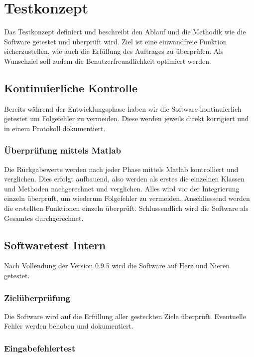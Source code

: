 \section{Testkonzept} \label{sec:Testkonzept}

Das Testkonzept definiert und beschreibt den Ablauf und die Methodik wie die Software getestet und überprüft wird. Ziel ist eine einwandfreie Funktion sicherzustellen, wie auch die Erfüllung des Auftrages zu überprüfen. Als Wunschziel soll zudem die Benutzerfreundlichkeit optimiert werden.


\subsection{Kontinuierliche Kontrolle } \label{subsec:1}

Bereits während der Entwicklungsphase haben wir die Software kontinuierlich getestet um Folgefehler zu vermeiden. Diese werden jeweils direkt korrigiert und in einem Protokoll dokumentiert. 

\subsubsection{Überprüfung mittels Matlab  } \label{subsubsec:1}

Die Rückgabewerte werden nach jeder Phase mittels Matlab kontrolliert und verglichen.
Dies erfolgt aufbauend, also werden als erstes die einzelnen Klassen und Methoden nachgerechnet und verglichen. Alles wird vor der Integrierung einzeln überprüft, um wiederum Folgefehler zu vermeiden. Anschliessend werden die erstellten Funktionen einzeln überprüft. Schlussendlich wird die Software als Gesamtes durchgerechnet.


\subsection{Softwaretest Intern} \label{subsec:2}

Nach Vollendung der Version 0.9.5 wird die Software auf Herz und Nieren getestet.

\subsubsection{Zielüberprüfung} \label{subsubsec:1}

Die Software wird auf die Erfüllung aller gesteckten Ziele überprüft. Eventuelle Fehler werden behoben und dokumentiert.

\subsubsection{Eingabefehlertest } \label{subsubsec:2}
 

